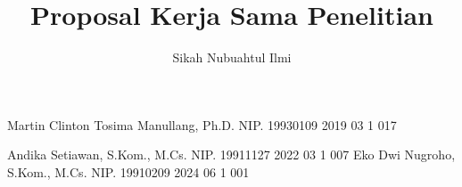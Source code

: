\documentclass[12pt, a4paper, onecolumn, oneside, final]{report}
\begin{document}
    \pagestyle{plain}
    \fancyhf{}
    \cfoot{\thepage}
    \fancyfoot[C]{\thepage} %

    
    \title{Proposal Kerja Sama Penelitian} %
    
    \author{Sikah Nubuahtul Ilmi}		%
	
	\dosbingA%
		{Martin Clinton Tosima Manullang, Ph.D.}%
		{NIP. 19930109 2019 03 1 017}				%
		
	\pengujiA%
		{Andika Setiawan, S.Kom., M.Cs.}%
		{NIP. 19911127 2022 03 1 007}				%
	\pengujiB%
		{Eko Dwi Nugroho, S.Kom., M.Cs.}%
		{NIP. 19910209 2024 06 1 001}				%

	\sloppy %



%    
%   
\clearpage
{}
\setcounter{page}{1}

\pagestyle{fancy}
\fancyhf{}                %
\fancyfoot[R]{\thepage}  %
\renewcommand{\headrulewidth}{0pt}
\renewcommand{\footrulewidth}{0pt}

\tableofcontents
\end{document}

